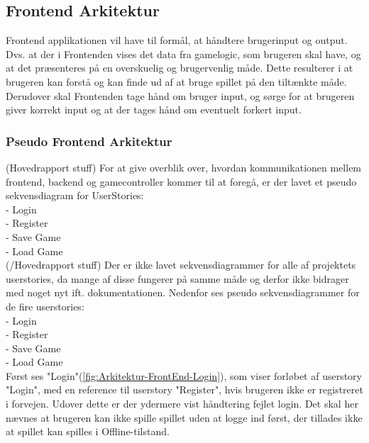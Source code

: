 \subsection{Frontend Arkitektur}

Frontend applikationen vil have til formål, at håndtere brugerinput og output. Dvs. at der i Frontenden vises det data fra gamelogic, som brugeren skal have, og at det præsenteres på en overskuelig og brugervenlig måde. Dette resulterer i at brugeren kan forstå og kan finde ud af at bruge spillet på den tiltænkte måde.
Derudover skal Frontenden tage hånd om bruger input, og sørge for at brugeren giver korrekt input og at der tages hånd om eventuelt forkert input.

\subsubsection{Pseudo Frontend Arkitektur}
(Hovedrapport stuff)
For at give overblik over, hvordan kommunikationen mellem frontend, backend og gamecontroller kommer til at foregå, er der lavet et pseudo sekvensdiagram for UserStories:
\\
- Login\\
- Register\\
- Save Game\\
- Load Game\\
(/Hovedrapport stuff)
Der er ikke lavet sekvensdiagrammer for alle af projektets userstories, da mange af disse fungerer på samme måde og derfor ikke bidrager med noget nyt ift. dokumentationen.
Nedenfor ses pseudo sekvensdiagrammer for de fire userstories:\\
- Login\\
- Register\\
- Save Game\\
- Load Game\\

\noindent Først ses "Login"(\autoref{fig:Arkitektur-FrontEnd-Login}), som viser forløbet af userstory "Login", med en reference til userstory "Register", hvis brugeren ikke er registreret i forvejen. Udover dette er der ydermere vist håndtering fejlet login. Det skal her nævnes at brugeren kan ikke spille spillet uden at logge ind først, der tillades ikke at spillet kan spilles i Offline-tilstand.\\


